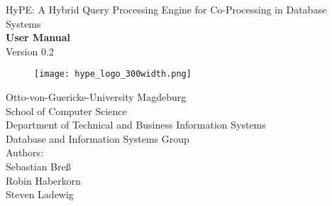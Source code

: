 \documentclass[a4paper]{book}
\begin{document}
\begin{titlepage}
 \begin{center}
  {\huge HyPE: A Hybrid Query Processing Engine for Co-Processing in Database Systems\\[1cm]}
  {\Large\bf User Manual\\[1.0cm]} 
  {\large Version 0.2}\\[0.2cm]
  \begin{figure}[h]
   \hbox{}\hfill
    \begin{minipage}[t]{10cm}
      \begin{center}
        \texttt{[image: hype\_logo\_300width.png]}
      \end{center}
    \end{minipage} 
   \hfill\hbox{}
  \end{figure}
  {\LARGE Otto-von-Guericke-University Magdeburg}\\
  {\large School of Computer Science \\ Department of Technical and Business Information Systems \\ Database and Information Systems Group \\[2cm]}
\vfill
  {\small Authors:}\\[0.2cm] {\large Sebastian Breß}\\[0.2cm]{\large Robin Haberkorn}\\[0.2cm] {\large Steven Ladewig}\\[0.2cm]

\end{center}
\end{titlepage}
\end{document}
